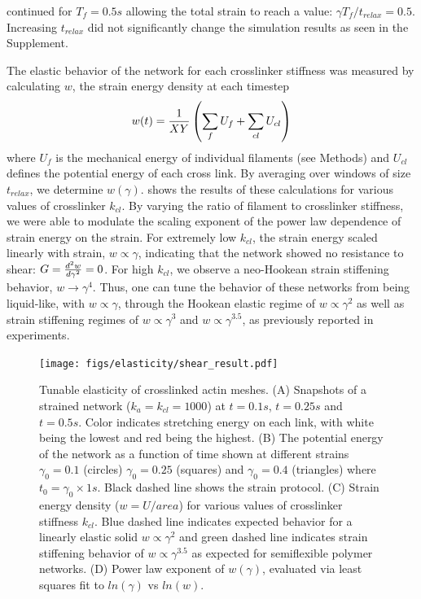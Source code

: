 \documentclass[12pt]{article}
\begin{document}
continued for $T_f=0.5s$ allowing the total strain to reach a value:
$\gamma T_f/t_{relax}=0.5$. Increasing $t_{relax}$ did not significantly change 
the simulation results as seen in the Supplement.
\par
The elastic behavior of the network for each crosslinker stiffness was measured
by calculating $w$, the strain energy density at each timestep
\begin{equation}
  w(t) = {1\over X Y}\left(\sum_f{ U_f}+\sum_{cl}{U_{cl}}\right)
  \label{eqn:sed}
\end{equation}
where $U_f$ is the mechanical energy of individual filaments (see Methods) and 
$U_{cl}$ defines the potential energy of each cross link. By averaging
over windows of size $t_{relax}$, we determine $w(\gamma)$.  
shows the results of these calculations for various values of
crosslinker $k_{cl}$. By varying the ratio of filament to crosslinker stiffness,
we were able to modulate the scaling exponent of the power law dependence of 
strain energy on the strain. For extremely low $k_{cl}$, the strain energy
scaled linearly with strain, $w\propto \gamma$, indicating that the network 
showed no resistance to shear: $G={d^2w\over d\gamma^2}=0$. For high $k_{cl}$, 
we observe a neo-Hookean strain stiffening behavior, $w\rightarrow\gamma^4$\cite{shokef2012}. 
Thus, one can tune the behavior of these networks from being liquid-like, 
with $w\propto\gamma$, through the Hookean elastic regime of $w\propto\gamma^2$ 
as well as strain stiffening regimes of $w\propto\gamma^3$ and
$w\propto\gamma^{3.5}$, as previously reported in experiments\cite{gardel2004, kasza2009}. 
\begin{figure}[H]
  \centering
  \texttt{[image: figs/elasticity/shear\_result.pdf]}
  \caption{%
    \label{fig:stress}%
    Tunable elasticity of crosslinked actin meshes. 
    (A) Snapshots of a strained network ($k_a=k_{cl}=1000$) at $t=0.1s$, 
    $t=0.25s$ and $t=0.5s$. Color indicates stretching energy on each link, with
    white being the lowest and red being the highest. 
    (B) The potential energy of the network as a function of time shown at
    different strains $\gamma_0=0.1$ (circles) $\gamma_0=0.25$ (squares) and
    $\gamma_0=0.4$ (triangles) where $t_0=\gamma_0\times 1s$. Black dashed line
    shows the strain protocol.   
    (C) Strain energy density ($w=U/area$) for various values of crosslinker
    stiffness $k_{cl}$. Blue dashed line indicates expected behavior for a 
    linearly elastic solid $w\propto \gamma^2$ and green dashed line indicates
    strain stiffening behavior of $w\propto \gamma^{3.5}$ as expected 
    for semiflexible polymer networks\cite{gardel2004,lin2010}.
   (D) Power law exponent of $w(\gamma)$, evaluated via least squares fit to
   $ln(\gamma)$ vs $ln(w)$. 
  }
\end{figure}
\end{document}
